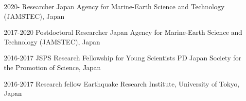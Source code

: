 

\begin{cvskills}

  \cvskill
    {2020-} %
    {Researcher} %
    {Japan Agency for Marine-Earth Science and Technology (JAMSTEC), Japan} %

  \cvskill
    {2017-2020} %
    {Postdoctoral Researcher} %
    {Japan Agency for Marine-Earth Science and Technology (JAMSTEC), Japan} %

  \cvskill
    {2016-2017} %
    {JSPS Research Fellowship for Young Scientists PD} %
    {Japan Society for the Promotion of Science, Japan} %

  \cvskill
    {2016-2017} %
    {Research fellow} %
    {Earthquake Research Institute, University of Tokyo, Japan} %

\end{cvskills}
